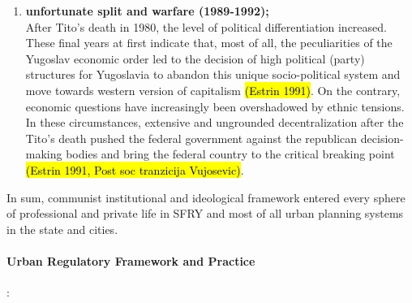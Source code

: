 \documentclass[11pt]{report}
\begin{document}
\begin{enumerate}
\item \textbf{unfortunate split and warfare (1989-1992);}
\\
After Tito's death in 1980, the level of political differentiation increased.
These final years at first indicate that, most of all, the peculiarities of the Yugoslav economic order led to the decision of high political (party) structures for Yugoslavia to abandon this unique socio-political system and  move towards western version of capitalism \hl{(Estrin 1991)}.
On the contrary, economic  questions  have  increasingly  been  overshadowed by  ethnic  tensions.
In these circumstances, extensive and ungrounded decentralization after the Tito's death pushed the federal government against the republican decision-making bodies and bring the federal country to the critical breaking point \hl{(Estrin 1991, Post soc tranzicija Vujosevic)}.
\end{enumerate}

In sum, communist institutional and ideological framework entered every sphere of professional and private life in SFRY and most of all urban planning systems in the state and cities. 

\paragraph{Urban Regulatory Framework and Practice}:
\end{document}
